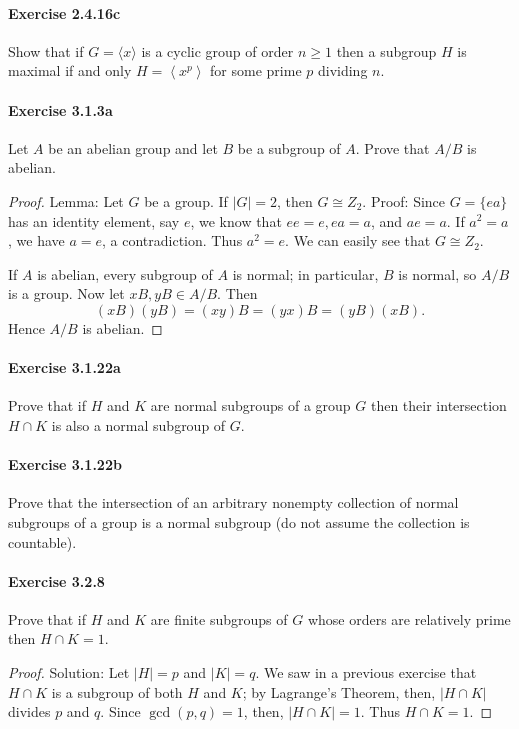 \documentclass{article}
\theoremstyle{definition}
\begin{document}
\paragraph{Exercise 2.4.16c} Show that if $G=\langle x\rangle$ is a cyclic group of order $n \geq 1$ then a subgroup $H$ is maximal if and only $H=\left\langle x^{p}\right\rangle$ for some prime $p$ dividing $n$.

\paragraph{Exercise 3.1.3a} Let $A$ be an abelian group and let $B$ be a subgroup of $A$. Prove that $A / B$ is abelian.
\begin{proof}
    Lemma: Let $G$ be a group. If $|G|=2$, then $G \cong Z_2$.
Proof: Since $G=\{e a\}$ has an identity element, say $e$, we know that $e e=e, e a=a$, and $a e=a$. If $a^2=a$, we have $a=e$, a contradiction. Thus $a^2=e$. We can easily see that $G \cong Z_2$.

If $A$ is abelian, every subgroup of $A$ is normal; in particular, $B$ is normal, so $A / B$ is a group. Now let $x B, y B \in A / B$. Then
$$
(x B)(y B)=(x y) B=(y x) B=(y B)(x B) .
$$
Hence $A / B$ is abelian.
\end{proof}


\paragraph{Exercise 3.1.22a} Prove that if $H$ and $K$ are normal subgroups of a group $G$ then their intersection $H \cap K$ is also a normal subgroup of $G$.

\paragraph{Exercise 3.1.22b} Prove that the intersection of an arbitrary nonempty collection of normal subgroups of a group is a normal subgroup (do not assume the collection is countable).

\paragraph{Exercise 3.2.8} Prove that if $H$ and $K$ are finite subgroups of $G$ whose orders are relatively prime then $H \cap K=1$.
\begin{proof}
    Solution: Let $|H|=p$ and $|K|=q$. We saw in a previous exercise that $H \cap K$ is a subgroup of both $H$ and $K$; by Lagrange's Theorem, then, $|H \cap K|$ divides $p$ and $q$. Since $\operatorname{gcd}(p, q)=1$, then, $|H \cap K|=1$. Thus $H \cap K=1$.
\end{proof}
\end{document}
